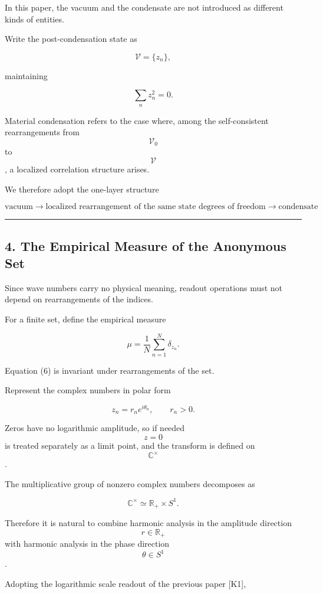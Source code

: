 \documentclass[
  a4paper,
]{article}
\begin{document}
In this paper, the vacuum and the condensate are not introduced as
different kinds of entities.

Write the post-condensation state as

\[
\mathcal V
=
\{z_n\},
\]

maintaining

\[
\sum_n z_n^2=0.
\tag{5}
\]

Material condensation refers to the case where, among the
self-consistent rearrangements from \[\mathcal V_0\] to \[\mathcal V\],
a localized correlation structure arises.

We therefore adopt the one-layer structure

\[
\boxed{
\text{vacuum}
\longrightarrow
\text{localized rearrangement of the same state degrees of freedom}
\longrightarrow
\text{condensate}
}
\]

\begin{center}\rule{0.5\linewidth}{0.5pt}\end{center}

\subsection{4. The Empirical Measure of the Anonymous
Set}\label{the-empirical-measure-of-the-anonymous-set}

Since wave numbers carry no physical meaning, readout operations must
not depend on rearrangements of the indices.

For a finite set, define the empirical measure

\[
\mu
=
\frac1N
\sum_{n=1}^{N}
\delta_{z_n}.
\tag{6}
\]

Equation (6) is invariant under rearrangements of the set.

Represent the complex numbers in polar form

\[
z_n
=
r_n e^{i\theta_n},
\qquad
r_n>0.
\]

Zeros have no logarithmic amplitude, so if needed \[z=0\] is treated
separately as a limit point, and the transform is defined on
\[\mathbb C^\times\].

The multiplicative group of nonzero complex numbers decomposes as

\[
\mathbb C^\times
\simeq
\mathbb R_+
\times
S^1.
\]

Therefore it is natural to combine harmonic analysis in the amplitude
direction \[r\in\mathbb R_+\] with harmonic analysis in the phase
direction \[\theta\in S^1\].

Adopting the logarithmic scale readout of the previous paper {[}K1{]},
\end{document}
